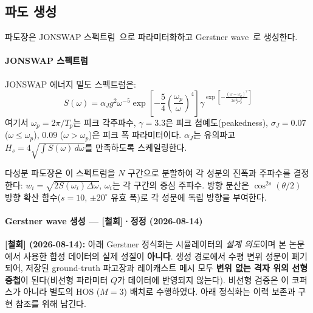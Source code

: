 \documentclass[11pt]{report}
\numberwithin{equation}{chapter}
\numberwithin{figure}{chapter}
\numberwithin{table}{chapter}
\begin{document}
\subsection{파도 생성}
\label{sec:wave_gen}

파도장은 JONSWAP 스펙트럼~\citep{Hasselmann1973}으로 파라미터화하고
Gerstner wave~\citep{Gerstner1802}로 생성한다.

\paragraph{JONSWAP 스펙트럼}
JONSWAP 에너지 밀도 스펙트럼은:
\begin{equation}
  S(\omega) = \alpha_J g^2 \omega^{-5}
    \exp\!\left[-\frac{5}{4}\left(\frac{\omega_p}{\omega}\right)^4\right]
    \gamma^{\exp\!\left[-\frac{(\omega - \omega_p)^2}{2\sigma_J^2 \omega_p^2}\right]}
  \label{eq:jonswap}
\end{equation}
여기서 $\omega_p = 2\pi/T_p$는 피크 각주파수,
$\gamma = 3.3$은 피크 첨예도(peakedness),
$\sigma_J = 0.07$ ($\omega \leq \omega_p$), $0.09$ ($\omega > \omega_p$)은
피크 폭 파라미터이다.
$\alpha_J$는 유의파고 $H_s = 4\sqrt{\int S(\omega)\,d\omega}$를
만족하도록 스케일링한다.

다성분 파도장은 이 스펙트럼을 $N$ 구간으로 분할하여 각 성분의 진폭과
주파수를 결정한다:
$w_i = \sqrt{2 S(\omega_i) \Delta\omega}$, $\omega_i$는 각 구간의 중심 주파수.
방향 분산은 $\cos^{2s}(\theta/2)$ 방향 확산 함수($s=10$, $\pm 20^\circ$ 유효 폭)로
각 성분에 독립 방향을 부여한다.

\paragraph{Gerstner wave 생성 --- [철회]·정정 (2026-08-14)}
\textbf{[철회] (2026-08-14):} 아래 Gerstner 정식화는 시뮬레이터의 \emph{설계 의도}이며
본 논문에서 사용한 합성 데이터의 실제 성질이 \textbf{아니다}. 생성 경로에서
수평 변위 성분이 폐기되어, 저장된 ground-truth 파고장과 레이캐스트 메시 모두
\textbf{변위 없는 격자 위의 선형 중첩}이 된다(비선형 파라미터 $Q$가 데이터에 반영되지 않는다).
비선형 검증은 이 코퍼스가 아니라 별도의 HOS ($M{=}3$) 배치로 수행하였다.
아래 정식화는 이력 보존과 구현 참조를 위해 남긴다.
\end{document}
